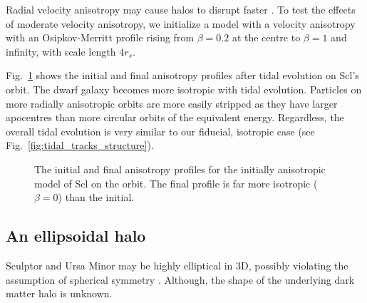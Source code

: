 Radial velocity anisotropy may cause halos to disrupt faster
\citep[e.g.][]{chiang+bosch+schive2024}. To test the effects of moderate
velocity anisotropy, we initialize a model with a velocity anisotropy
with an Osipkov-Merritt profile rising from \(\beta=0.2\) at the centre
to \(\beta=1\) and infinity, with scale length \(4r_s\).

Fig.~\ref{fig:anisotropy_i_f} shows the initial and final anisotropy
profiles after tidal evolution on Scl's \smallperi{} orbit. The dwarf
galaxy becomes more isotropic with tidal evolution. Particles on more
radially anisotropic orbits are more easily stripped as they have larger
apocentres than more circular orbits of the equivalent energy.
Regardless, the overall tidal evolution is very similar to our fiducial,
isotropic case (see Fig.~\ref{fig:tidal_tracks_structure}).

\begin{figure}
\centering
{}
\caption[Tidal evolution of anisotropy]{The initial and final anisotropy
profiles for the initially anisotropic model of Scl on the \smallperi{}
orbit. The final profile is far more isotropic (\(\beta=0\)) than the
initial.}\label{fig:anisotropy_i_f}
\end{figure}

\subsection{An ellipsoidal halo}\label{an-ellipsoidal-halo}

Sculptor and Ursa Minor may be highly elliptical in 3D, possibly
violating the assumption of spherical symmetry
\citep[e.g.,][]{an+koposov2022}. Although, the shape of the underlying
dark matter halo is unknown.

